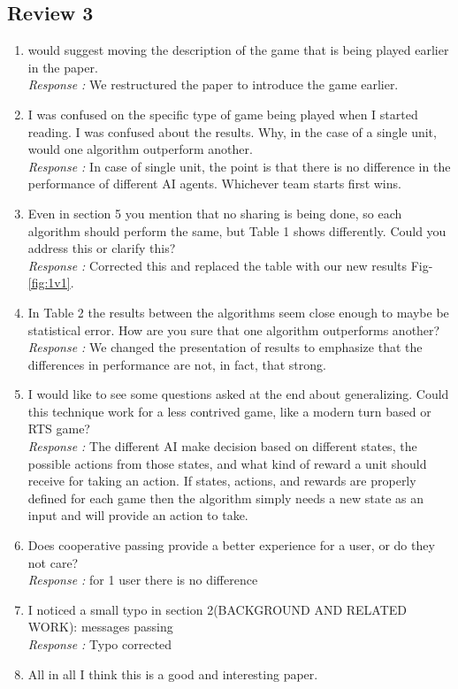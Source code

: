 \subsection{Review 3}
\begin{enumerate}
\item would suggest moving the description of the game that is being played earlier in the paper.
\\{\it Response : }We restructured the paper to introduce the game earlier.

\item I was confused on the specific type of game being played when I started reading.
I was confused about the results. Why, in the case of a single unit, would one algorithm outperform another. 
\\{\it Response : } In case of single unit, the point is that there is no difference in the performance of different AI agents. Whichever team starts first wins.

\item Even in section 5 you mention that no sharing is being done, so each algorithm should perform the same, but Table 1 shows differently. Could you address this or clarify this?
\\{\it Response : } Corrected this and replaced the table with our new results Fig-\ref{fig:1v1}.

\item In Table 2 the results between the algorithms seem close enough to maybe be statistical error. How are you sure that one algorithm outperforms another?
\\{\it Response : }We changed the presentation of results to emphasize that the differences in performance are not, in fact, that strong.

\item I would like to see some questions asked at the end about generalizing. Could this technique work for a less contrived game, like a modern turn based or RTS game? 
\\{\it Response : }The different AI make decision based on different states, the possible actions from those states, and what kind of reward a unit should receive for taking an action. If states, actions, and rewards are properly defined for each game then the algorithm simply needs a new state as an input and will provide an action to take.


\item Does cooperative passing provide a better experience for a user, or do they not care?
\\{\it Response : }for 1 user there is no difference

\item I noticed a small typo in section 2(BACKGROUND AND RELATED WORK): messages passing
\\{\it Response : }Typo corrected
\item All in all I think this is a good and interesting paper.
\end{enumerate}

